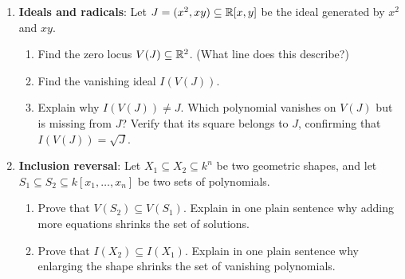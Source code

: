 \begin{enumerate}
\begin{enumerate}
\item By examining the lowest-degree terms of $f(x, y)$ near this point, determine whether the singularity is a node (crossing point with two distinct tangents) or a cusp (single shared tangent).
\end{enumerate}
\item \textbf{Ideals and radicals}: Let $J = (x^2, xy) \subseteq \mathbb{R}[x, y]$ be the ideal generated by $x^2$ and $xy$.
\begin{enumerate}
\item Find the zero locus $V(J) \subseteq \mathbb{R}^2$. (What line does this describe?)
\item Find the vanishing ideal $I(V(J))$.
\item Explain why $I(V(J)) \neq J$. Which polynomial vanishes on $V(J)$ but is missing from $J$? Verify that its square belongs to $J$, confirming that $I(V(J)) = \sqrt{J}$.
\end{enumerate}
\item \textbf{Inclusion reversal}: Let $X_1 \subseteq X_2 \subseteq k^n$ be two geometric shapes, and let $S_1 \subseteq S_2 \subseteq k[x_1, \dots, x_n]$ be two sets of polynomials.
\begin{enumerate}
\item Prove that $V(S_2) \subseteq V(S_1)$. Explain in one plain sentence why adding more equations shrinks the set of solutions.
\item Prove that $I(X_2) \subseteq I(X_1)$. Explain in one plain sentence why enlarging the shape shrinks the set of vanishing polynomials.
\end{enumerate}
\end{enumerate}

\newpage

